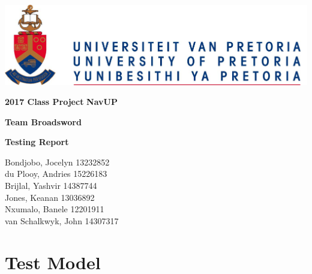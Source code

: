 \documentclass[12pt]{article}
\begin{document}
\begin{titlepage}
\begin{center}
\includegraphics[scale=1]{diagrams/up.png}
\\
\begin{huge}
\textbf{2017 Class Project}
\textbf{NavUP}\\
\end{huge}
\hfill \break
\begin{huge}
\begin{center}
\textbf{Team Broadsword}

\textbf{Testing Report}
\end{center}
\end{huge}
\hfill \break
\hfill \break
\begin{small}
	Bondjobo, Jocelyn 	13232852 \\
	du Plooy, Andries	15226183 \\
	Brijlal, Yashvir	14387744 \\
	Jones, Keanan		13036892 \\	
	Nxumalo, Banele		12201911 \\
	van Schalkwyk, John	14307317 \\
\end{small}

\end{center}
\end{titlepage}

\newpage
{}
\thispagestyle{empty}
\tableofcontents
\clearpage

\section{Test Model}
\end{document}
